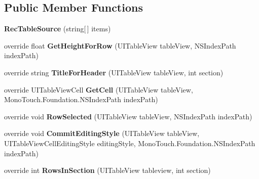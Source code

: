 \subsection*{Public Member Functions}
\begin{DoxyCompactItemize}
\item 
\hypertarget{class_pro_scan_mobile_1_1_rec_table_source_ab73f5cf14799e5ef7eae84df12566671}{{\bfseries Rec\-Table\-Source} (string\mbox{[}$\,$\mbox{]} items)}\label{class_pro_scan_mobile_1_1_rec_table_source_ab73f5cf14799e5ef7eae84df12566671}

\item 
\hypertarget{class_pro_scan_mobile_1_1_rec_table_source_ad731ea1b0e706282e863c273dbbc4316}{override float {\bfseries Get\-Height\-For\-Row} (U\-I\-Table\-View table\-View, N\-S\-Index\-Path index\-Path)}\label{class_pro_scan_mobile_1_1_rec_table_source_ad731ea1b0e706282e863c273dbbc4316}

\item 
\hypertarget{class_pro_scan_mobile_1_1_rec_table_source_a0472474af7c7cbaa6bb34f72d9548067}{override string {\bfseries Title\-For\-Header} (U\-I\-Table\-View table\-View, int section)}\label{class_pro_scan_mobile_1_1_rec_table_source_a0472474af7c7cbaa6bb34f72d9548067}

\item 
\hypertarget{class_pro_scan_mobile_1_1_rec_table_source_abb9ecbeca34ad656249585527a19289b}{override U\-I\-Table\-View\-Cell {\bfseries Get\-Cell} (U\-I\-Table\-View table\-View, Mono\-Touch.\-Foundation.\-N\-S\-Index\-Path index\-Path)}\label{class_pro_scan_mobile_1_1_rec_table_source_abb9ecbeca34ad656249585527a19289b}

\item 
\hypertarget{class_pro_scan_mobile_1_1_rec_table_source_a72b2c22fe65636fcdd76a6b00806bc31}{override void {\bfseries Row\-Selected} (U\-I\-Table\-View table\-View, N\-S\-Index\-Path index\-Path)}\label{class_pro_scan_mobile_1_1_rec_table_source_a72b2c22fe65636fcdd76a6b00806bc31}

\item 
\hypertarget{class_pro_scan_mobile_1_1_rec_table_source_aae1433be7b808d9b57768197f8f2b999}{override void {\bfseries Commit\-Editing\-Style} (U\-I\-Table\-View table\-View, U\-I\-Table\-View\-Cell\-Editing\-Style editing\-Style, Mono\-Touch.\-Foundation.\-N\-S\-Index\-Path index\-Path)}\label{class_pro_scan_mobile_1_1_rec_table_source_aae1433be7b808d9b57768197f8f2b999}

\item 
\hypertarget{class_pro_scan_mobile_1_1_rec_table_source_ad0a7ec7a1c8d190996204d21f5e042a1}{override int {\bfseries Rows\-In\-Section} (U\-I\-Table\-View tableview, int section)}\label{class_pro_scan_mobile_1_1_rec_table_source_ad0a7ec7a1c8d190996204d21f5e042a1}


\end{DoxyCompactItemize}
